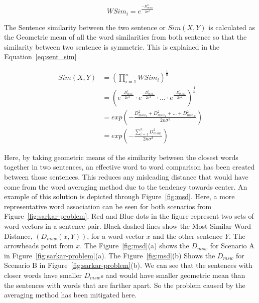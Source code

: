 \begin{equation}\label{eq:wsim}
    WSim_i = e^{\frac{-D_{msw_i}^2}{2\sigma^2}}
\end{equation}

The Sentence similarity between the two sentence or $Sim(X,Y)$ is calculated as the Geometric mean of all the word similarities from both sentence so that the similarity between two sentence is symmetric. This is explained in the Equation~\ref{eq:sent_sim}

\begin{equation}\label{eq:sent_sim}
    \begin{split}
        Sim(X,Y)
        &=  \left(
                \prod_{i=1}^nWSim_i
            \right)^{\frac{1}{n}}\\
        &=  \left(
                e^{\frac{-D_{msw_1}^2}{2\sigma^2}}\cdot
                e^{\frac{-D_{msw_2}^2}{2\sigma^2}}\cdot
                    \ldots \cdot
                e^{\frac{-D_{msw_n}^2}{2\sigma^2}}
            \right)^\frac{1}{n}\\
        &=  exp\left(
                -\frac{D_{msw_1}^2+D_{msw_2}^2+\ldots+D_{msw_n}^2}{2n\sigma^2}
            \right)\\
        &=  exp\left(
                -\frac{\sum_{i=1}^nD_{msw_i}^2}{2n\sigma^2}
            \right)
    \end{split}
\end{equation}

Here, by taking geometric means of the similarity between the closest words together in two sentences, an effective word to word comparison has been created between those sentences. This reduces any misleading distance that would have come from the word averaging method due to the tendency towards center. An example of this solution is depicted through Figure~\ref{fig:msd}. Here, a more representative word association can be seen for both scenarios from Figure~\ref{fig:sarkar-problem}. Red and Blue dots in the figure represent two sets of word vectors in a sentence pair. Black-dashed lines show the Most Similar Word Distance, $(D_{msw}(x,Y))$, for a word vector $x$ and the other sentence $Y$. The arrowheads point from $x$. The Figure~\ref{fig:msd}(a) shows the $D_{msw}$ for Scenario A in Figure~\ref{fig:sarkar-problem}(a). The Figure~\ref{fig:msd}(b) Shows the $D_{msw}$ for Scenario B in Figure~\ref{fig:sarkar-problem}(b). We can see that the sentences with closer words have smaller $D_{msw}$s and would have smaller geometric mean than the sentences with words that are farther apart. So the problem caused by the averaging method has been mitigated here.\\

